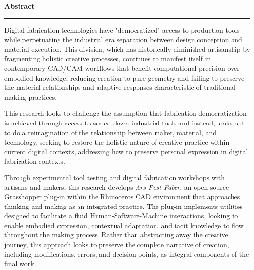\setcounter{chapter}{0}
\setcounter{section}{0}


\pagestyle{fancy}
\fancyhf{} 
\fancyfoot[C]{\thepage} 
\renewcommand{\headrulewidth}{0pt}
\renewcommand{\footrulewidth}{0pt}

\noindent
{\Large\textbf{Abstract}}
\vspace{0.3cm}
\hrule
\vspace{0.8cm}

\setlength{\parindent}{0pt}

Digital fabrication technologies have "democratized" access to production tools while perpetuating the industrial era separation between design conception and material execution. This division, which has historically diminished artisanship by fragmenting holistic creative processes, continues to manifest itself in contemporary CAD/CAM workflows that benefit computational precision over embodied knowledge, reducing creation to pure geometry and failing to preserve the material relationships and adaptive responses characteristic of traditional making practices.

\vspace{0.5cm}

This research looks to challenge the assumption that fabrication democratization is achieved through access to scaled-down industrial tools and instead, looks out to do a reimagination of the relationship between maker, material, and technology, seeking to restore the holistic nature of creative practice within current digital contexts, addressing how to preserve personal expression in digital fabrication contexts.

\vspace{0.5cm}

Through experimental tool testing and digital fabrication workshops with artisans and makers, this research develops \textit{Ars Post Faber}, an open-source Grasshopper plug-in within the Rhinoceros CAD environment that approaches thinking and making as an integrated practice. The plug-in implements utilities designed to facilitate a fluid Human-Software-Machine interactions, looking to enable embodied expression, contextual adaptation, and tacit knowledge to flow throughout the making process. Rather than abstracting away the creative journey, this approach looks to preserve the complete narrative of creation, including modifications, errors, and decision points, as integral components of the final work.

